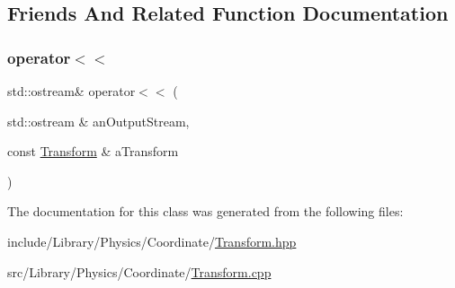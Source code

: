 \subsection{Friends And Related Function Documentation}
\mbox{\label{classlibrary_1_1physics_1_1coord_1_1_transform_ae46ab7a297c23b757fd6f41bf30c4054}} 
\subsubsection{\texorpdfstring{operator$<$$<$}{operator<<}}
{\footnotesize\ttfamily std\+::ostream\& operator$<$$<$ (\begin{DoxyParamCaption}\item[{std\+::ostream \&}]{an\+Output\+Stream,  }\item[{const \hyperlink{classlibrary_1_1physics_1_1coord_1_1_transform}{Transform} \&}]{a\+Transform }\end{DoxyParamCaption})\hspace{0.3cm}{\ttfamily [friend]}}



The documentation for this class was generated from the following files\+:\begin{DoxyCompactItemize}
\item 
include/\+Library/\+Physics/\+Coordinate/\hyperlink{_transform_8hpp}{Transform.\+hpp}\item 
src/\+Library/\+Physics/\+Coordinate/\hyperlink{_transform_8cpp}{Transform.\+cpp}\end{DoxyCompactItemize}
